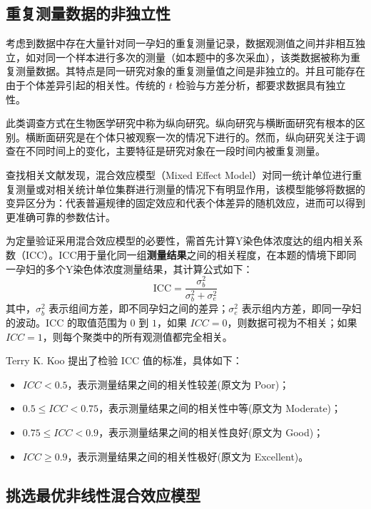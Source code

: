 \subsection{重复测量数据的非独立性}

考虑到数据中存在大量针对同一孕妇的重复测量记录，数据观测值之间并非相互独立，如对同一个样本进行多次的测量（如本题中的多次采血），该类数据被称为重复测量数据\cite{feng2020}。其特点是同一研究对象的重复测量值之间是非独立的。并且可能存在由于个体差异引起的相关性。传统的 $t$ 检验与方差分析，都要求数据具有独立性。

此类调查方式在生物医学研究中称为纵向研究。纵向研究与横断面研究有根本的区别。横断面研究是在个体只被观察一次的情况下进行的。然而，纵向研究关注于调查在不同时间上的变化，主要特征是研究对象在一段时间内被重复测量。

查找相关文献发现，混合效应模型（Mixed Effect Model）对同一统计单位进行重复测量或对相关统计单位集群进行测量的情况下有明显作用\cite{gomes2022should}，该模型能够将数据的变异区分为：代表普遍规律的固定效应和代表个体差异的随机效应\cite{gomes2022should}，进而可以得到更准确可靠的参数估计。

为定量验证采用混合效应模型的必要性，需首先计算Y染色体浓度达的组内相关系数（ICC）。ICC用于量化同一组\textbf{测量结果}之间的相关程度，在本题的情境下即同一孕妇的多个Y染色体浓度测量结果，其计算公式如下\cite{yu2022beyond}：
\begin{equation}
    \text{ICC} = \frac{\sigma_b^2}{\sigma_b^2 + \sigma_e^2}
\end{equation}
其中，$\sigma_b^2$ 表示组间方差，即不同孕妇之间的差异；$\sigma_e^2$ 表示组内方差，即同一孕妇的波动。ICC 的取值范围为 $0$ 到 $1$，如果 $ICC = 0$，则数据可视为不相关；如果 $ICC = 1$，则每个聚类中的所有观测值都完全相关。

Terry K. Koo 提出了检验 ICC 值的标准\cite{koo2016guideline}，具体如下：

\begin{itemize}[leftmargin=2em]
    \item $ICC < 0.5$，表示测量结果之间的相关性较差(原文为 Poor)；
    \item $0.5 \leq ICC < 0.75$，表示测量结果之间的相关性中等(原文为 Moderate)；
    \item $0.75 \leq ICC < 0.9$，表示测量结果之间的相关性良好(原文为 Good)；
    \item $ICC \geq 0.9$，表示测量结果之间的相关性极好(原文为 Excellent)。
\end{itemize}

\subsection{挑选最优非线性混合效应模型}


